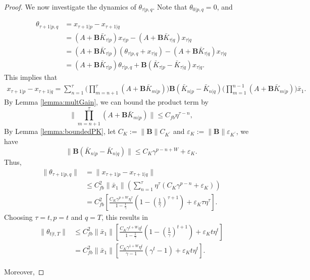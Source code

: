 \documentclass{article}
\newcommand{\BK}[1]{\mathbf{B}\bar{K}_{#1}}
\begin{document}
\begin{proof}
We now investigate the dynamics of $\theta_{\tau|p,q}$. Note that $\theta_{0|p,q} = 0$, and 

\begin{align*}
    \theta_{\tau+1|p,q} &= x_{\tau+1|p} - x_{\tau+1|q}\\
    &= (A+\BK{\tau|p})x_{\tau|p}-(A+\BK{\tau|q})x_{\tau|q}\\
    &= (A+\BK{\tau|p})(\theta_{\tau|p,q}+x_{\tau|q})-(A+\BK{\tau|q})x_{\tau|q}\\
    &= (A+\BK{\tau|p})\theta_{\tau|p,q} + \mathbf{B}(\bar{K}_{\tau|p}-\bar{K}_{\tau|q})x_{\tau|q}.
\end{align*}
This implies that
\begin{align*}
    x_{\tau+1|p} - x_{\tau+1|q} = \sum_{n=1}^{\tau}\bigg(\prod_{m=n+1}^{\tau}(A+\BK{m|p})\bigg)\mathbf{B}(\bar{K}_{n|p}-\bar{K}_{n|q})\bigg(\prod_{m=1}^{n-1}(A+\BK{m|p})\bigg)\bar{x}_{1}.
\end{align*}
By Lemma \ref{lemma:multGain}, we can bound the product term by
\begin{equation*}
    \| \prod_{m=n+1}^{\tau}(A+\BK{m|p})\| \leq C_{fb}\eta^{\tau-n},
\end{equation*}
By Lemma \ref{lemma:boundedPK}, let $C_{K} := \|\mathbf{B}\|C_{K^{'}}$ and $\varepsilon_{K} := \|\mathbf{B}\|\varepsilon_{K^{'}}$, we have
\begin{equation*}
    \|\mathbf{B}(\bar{K}_{n|p}-\bar{K}_{n|q})\| \leq C_{K}\gamma^{p-n+W}+\varepsilon_{K}.
\end{equation*}
Thus,
\begin{align*}
    \|\theta_{\tau+1|p,q}\| &= \|x_{\tau+1|p}-x_{\tau+1|q}\|\\
    &\leq C_{fb}^{2}\|\bar{x}_{1}\|(\sum_{n=1}^{\tau}\eta^{\tau}(C_{K}\gamma^{p-n}+\varepsilon_{K}))\\
    &= C_{fb}^{2}[\frac{C_{K}\gamma^{p+W}\eta^{\tau}}{1-\frac{1}{\gamma}}(1-(\frac{1}{\gamma})^{\tau+1})+ \varepsilon_{K}\tau\eta^{\tau}].
\end{align*}
Choosing $\tau = t,p = t$ and $q = T$, this results in
\begin{align*}
    \|\theta_{t|t,T}\| &\leq C^{2}_{fb}\|\bar{x}_{1}\|[\frac{C_{K}\gamma^{t+W}\eta^{t}}{1-\frac{1}{\gamma}}(1-(\frac{1}{\gamma})^{t+1}) + \varepsilon_{K}t\eta^{t}]\\
    &= C^{2}_{fb}\|\bar{x}_{1}\|[\frac{C_{K}\gamma^{1+W}\eta^{t}}{\gamma-1}(\gamma^{t}-1) + \varepsilon_{K}t\eta^{t}].
\end{align*}

Moreover,


\end{proof}
\end{document}

